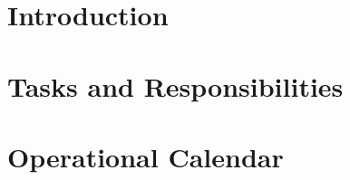 


\chapter{Introduction}\label{intro}


\chapter{Tasks and Responsibilities}\label{tasks}


\chapter{Operational Calendar}\label{opcal}
















